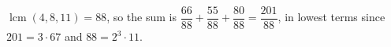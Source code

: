 $\operatorname{lcm}(4,8,11)=88$, so the sum is $\dfrac{66}{88}+\dfrac{55}{88}+\dfrac{80}{88}=\boxed{\dfrac{201}{88}}$, in lowest terms since $201=3\cdot67$ and $88=2^3\cdot11$.
